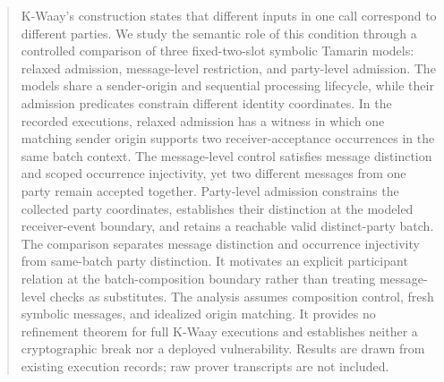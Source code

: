 \begin{abstract}
K-Waay's \batchreceive construction states that different inputs in one call
correspond to different parties. We study the semantic role of this condition
through a controlled comparison of three fixed-two-slot symbolic Tamarin
models: relaxed admission, message-level restriction, and party-level
admission. The models share a sender-origin and sequential processing
lifecycle, while their admission predicates constrain different identity
coordinates. In the recorded executions, relaxed admission has a witness in
which one matching sender origin supports two receiver-acceptance occurrences
in the same batch context. The message-level control satisfies message
distinction and scoped occurrence injectivity, yet two different messages
from one party remain accepted together. Party-level admission constrains the
collected party coordinates, establishes their distinction at the modeled
receiver-event boundary, and retains a reachable valid distinct-party batch.
The comparison separates message distinction and occurrence injectivity from
same-batch party distinction. It motivates an explicit participant relation
at the batch-composition boundary rather than treating message-level checks
as substitutes. The analysis assumes composition control, fresh symbolic
messages, and idealized origin matching. It provides no refinement theorem
for full K-Waay executions and establishes neither a cryptographic break nor
a deployed vulnerability. Results are drawn from existing execution records;
raw prover transcripts are not included.
\end{abstract}
